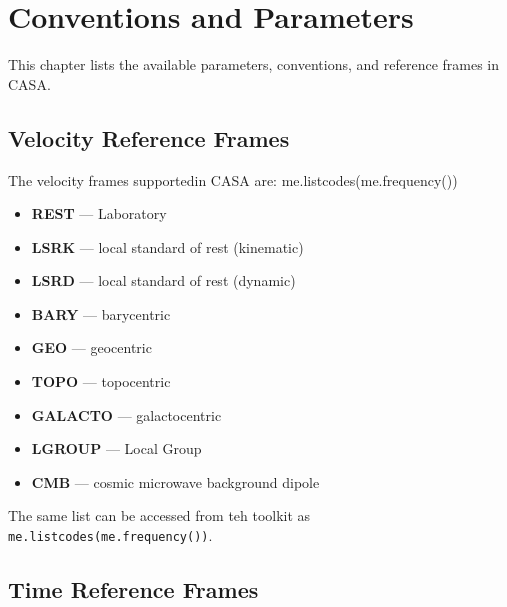 

\chapter[Appendix: Conventions and Parameters]
         {Conventions and Parameters}
\label{chapter:conventions}

This chapter lists the available parameters, conventions, and
reference frames in CASA.

\section{Velocity Reference Frames}
\label{section:conv.vel}

The velocity frames supportedin CASA are:
me.listcodes(me.frequency())

\begin{itemize}
\item {\bf REST} --- Laboratory
\item {\bf LSRK} --- local standard of rest (kinematic)
\item {\bf LSRD} --- local standard of rest (dynamic)
\item {\bf BARY} --- barycentric
\item {\bf GEO} --- geocentric
\item {\bf TOPO} --- topocentric
\item {\bf GALACTO} --- galactocentric
\item {\bf LGROUP} --- Local Group
\item {\bf CMB} --- cosmic microwave background dipole
\end{itemize}

The same list can be accessed from teh toolkit as {\tt me.listcodes(me.frequency())}.

\section{Time Reference Frames}
\label{section:conv.time}

